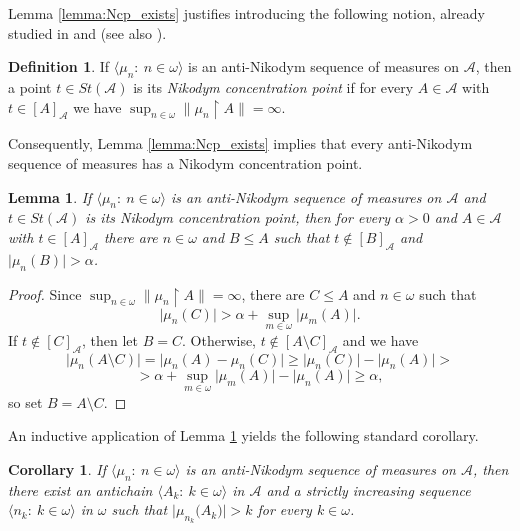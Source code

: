 \documentclass[a4paper,11pt,fleqn]{amsart}
\newtheorem{lemma}[theorem]{Lemma}
\newtheorem{corollary}[theorem]{Corollary}
\theoremstyle{definition}
\newtheorem{definition}[theorem]{Definition}
\theoremstyle{remark}
\numberwithin{equation}{section}
\newcommand{\N}{\mathbb{N}}
\newcommand{\aA}{\mathcal{A}}
\newcommand{\rstr}{\restriction}
\newcommand{\sm}{\setminus}
\newcommand{\seqn}[1]{\big\langle#1\colon\ n\io\big\rangle}
\newcommand{\seqk}[1]{\big\langle#1\colon\ k\io\big\rangle}
\newcommand{\clopen}[1]{\left[#1\right]}
\newcommand{\iA}{\in\aA}
\newcommand{\io}{\in\omega}%
\begin{document}
Lemma \ref{lemma:Ncp_exists} justifies introducing the following notion, already studied in \cite{Sob19} and \cite{SZ17} (see also \cite{Aiz92}).

\begin{definition}\label{def:nik_cp}
If $\seqn{\mu_n}$ is an anti-Nikodym sequence of measures on $\aA$, then a point $t\in St(\aA)$ is its \textit{Nikodym concentration point} if for every $A\iA$ with $t\in\clopen{A}_\aA$ we have $\sup_{n\io}\big\|\mu_n\rstr A\big\|=\infty$.
\end{definition}

Consequently, Lemma \ref{lemma:Ncp_exists} implies that every anti-Nikodym sequence of measures has a Nikodym concentration point.

\begin{lemma}\label{lemma:Ncp_large_nhbds}
If $\seqn{\mu_n}$ is an anti-Nikodym sequence of measures on $\aA$ and $t\in St(\aA)$ is its Nikodym concentration point, then for every $\alpha>0$ and $A\in\aA$ with $t\in\clopen{A}_\aA$ there are $n\io$ and $B\le A$ such that $t\not\in\clopen{B}_\aA$ and $\big|\mu_n(B)\big|>\alpha$.
\end{lemma}
\begin{proof}
    Since $\sup_{n\io}\big\|\mu_n\rstr A\big\|=\infty$, there are $C\le A$ and $n\io$ such that
    \[\big|\mu_n(C)\big|>\alpha+\sup_{m\io}\big|\mu_m(A)\big|.\]
    If $t\not\in\clopen{C}_\aA$, then let $B=C$. Otherwise, $t\not\in\clopen{A\sm C}_\aA$ and we have
    \[\big|\mu_n(A\sm C)\big|=\big|\mu_n(A)-\mu_n(C)\big|\ge\big|\mu_n(C)\big|-\big|\mu_n(A)\big|>\]
    \[>\alpha+\sup_{m\io}\big|\mu_m(A)\big|-\big|\mu_n(A)\big|\ge\alpha,\]
    so set $B=A\sm C$.
\end{proof}

An inductive application of Lemma \ref{lemma:Ncp_large_nhbds} yields the following standard corollary.

\begin{corollary}\label{cor:antiN_antichain}
If $\seqn{\mu_n}$ is an anti-Nikodym sequence of measures on $\aA$, then there exist an antichain $\seqk{A_k}$ in $\aA$ and a strictly increasing sequence $\seqk{n_k}$ in $\omega$ such that $\big|\mu_{n_k}\big(A_k\big)\big|>k$ for every $k\io$.
\end{corollary}

\end{document}
